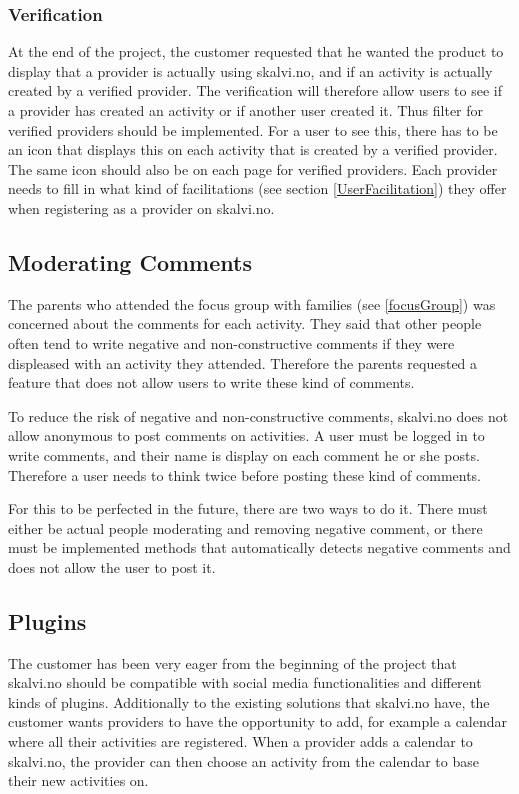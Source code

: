 \subsubsection{Verification}
At the end of the project, the customer requested that he wanted the product to display that a provider is actually using skalvi.no, and if an activity is actually created by a verified provider. The verification will therefore allow users to see if a provider has created an activity or if another user created it. Thus filter for verified providers should be implemented. For a user to see this, there has to be an icon that displays this on each activity that is created by a verified provider. The same icon should also be on each page for verified providers. Each provider needs to fill in what kind of facilitations (see section \ref{UserFacilitation}) they offer when registering as a provider on skalvi.no. 


\subsection{Moderating Comments}
The parents who attended the focus group with families (see \ref{focusGroup}) was concerned about the comments for each activity. They said that other people often tend to write negative and non-constructive comments if they were displeased with an activity they attended. Therefore the parents requested a feature that does not allow users to write these kind of comments. 

To reduce the risk of negative and non-constructive comments, skalvi.no does not allow anonymous to post comments on activities. A user must be logged in to write comments, and their name is display on each comment he or she posts. Therefore a user needs to think twice before posting these kind of comments. 

For this to be perfected in the future, there are two ways to do it. There must either be actual people moderating and removing negative comment, or there must be implemented methods that automatically detects negative comments and does not allow the user to post it. 

\subsection{Plugins}
The customer has been very eager from the beginning of the project that skalvi.no should be compatible with social media functionalities and different kinds of plugins. Additionally to the existing solutions that skalvi.no have, the customer wants providers to have the opportunity to add, for example a calendar where all their activities are registered. When a provider adds a calendar to skalvi.no, the provider can then choose an activity from the calendar to base their new activities on.

